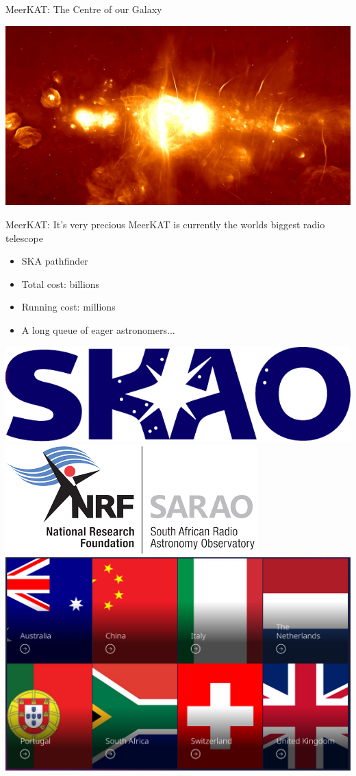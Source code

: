 \documentclass[ignorenonframetext]{beamer}
\begin{document}
\begin{frame}{MeerKAT: The Centre of our Galaxy}
 \begin{center}
  \includegraphics[width=\linewidth]{fig/MeerKAT_GalacticCentre_image.jpeg}
 \end{center}

\end{frame}


\begin{frame}{MeerKAT: It's very precious}
MeerKAT is currently the worlds biggest radio telescope
\begin{itemize}
\item SKA pathfinder
\item Total cost: billions
\item Running cost: millions
\item A long queue of eager astronomers...
\end{itemize}
\includegraphics[width=0.32\linewidth]{fig/ska-logo-color.pdf}
\includegraphics[width=0.32\linewidth]{fig/NRF_SARAO_sm1.png}
\includegraphics[width=0.32\linewidth]{fig/ska-partners.png}
\end{frame}
\end{document}
